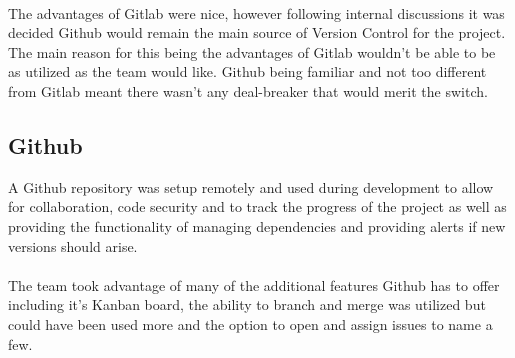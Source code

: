 \paragraph{}
The advantages of Gitlab were nice, however following internal discussions it was decided Github would remain the main source of Version Control for the project. The main reason for this being the advantages of Gitlab wouldn't be able to be as utilized as the team would like. Github being familiar and not too different from Gitlab meant there wasn't any deal-breaker that would merit the switch.

\subsection{Github}
A Github repository was setup remotely and used during development to allow for collaboration, code security and to track the progress of the project as well as providing the functionality of managing dependencies and providing alerts if new versions should arise. 

\paragraph{}
The team took advantage of many of the additional features Github has to offer including it's Kanban board, the ability to branch and merge was utilized but could have been used more and the option to open and assign issues to name a few.
